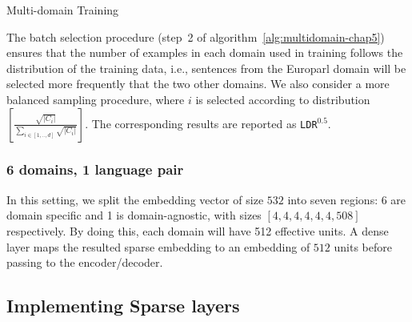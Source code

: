 \begin{algorithm}[h]
\caption{Multi-domain Training}
\label{alg:multidomain-chap5}
\begin{algorithmic}[1]
\REPEAT 
{}
\end{algorithmic}
\end{algorithm}
The batch selection procedure (step~2 of algorithm~\ref{alg:multidomain-chap5}) ensures that the number of examples in each domain used in training  follows the distribution of the training data, i.e., sentences from the Europarl domain will be selected more frequently that the two other domains. We also consider a more balanced sampling procedure, where $i$ is selected according to  distribution $[\frac{\sqrt{|C_i|}}{\sum_{i\in [1,..,d]}\sqrt{|C_i|}}]$. The corresponding results are reported as \texttt{LDR}$^{0.5}$.
\subsubsection{6 domains, 1 language pair}
\label{sssec:ldr6domain-chap5}
In this setting, we split the embedding vector of size $532$ into seven regions: 6 are domain specific and 1 is domain-agnostic, with sizes $[4,4,4,4,4,4,508]$ respectively. By doing this, each domain will have 512 effective units. A dense layer maps the resulted sparse  embedding to an embedding of $512$ units before passing to the encoder/decoder.

\subsection{Implementing Sparse layers}
